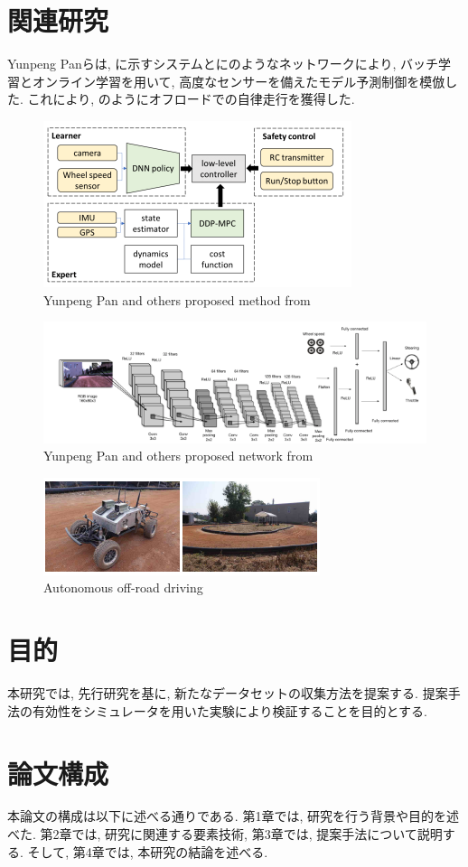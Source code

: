 \newpage
\section{関連研究}
Yunpeng Pan\cite{batch}らは, に示すシステムとにのようなネットワークにより, バッチ学習とオンライン学習を用いて, 高度なセンサーを備えたモデル予測制御を模倣した. これにより, のようにオフロードでの自律走行を獲得した. 

\begin{figure}[h]
     \centering
     \includegraphics[keepaspectratio, scale=0.7]{images/batch1.png}
     \caption{Yunpeng Pan and others proposed method from \cite{batch}}
     \label{Fig:batch1}
     \end{figure}

\begin{figure}[h]
     \centering
     \includegraphics[keepaspectratio, scale=0.5]{images/net.png}
     \caption{Yunpeng Pan and others proposed network from \cite{net}}
     \label{Fig:net}
     \end{figure}

\begin{figure}[h]
     \centering
     \includegraphics[keepaspectratio, scale=0.7]{images/batch2.png}
     \caption{Autonomous off-road driving}
     \label{Fig:batch2}
     \end{figure}


\newpage
\section{目的}
本研究では, 先行研究を基に, 新たなデータセットの収集方法を提案する. 提案手法の有効性をシミュレータを用いた実験により検証することを目的とする. 

\section{論文構成}
本論文の構成は以下に述べる通りである. 第1章では, 研究を行う背景や目的を述べた. 第2章では, 研究に関連する要素技術, 第3章では, 提案手法について説明する. そして, 第4章では, 本研究の結論を述べる. 
     
